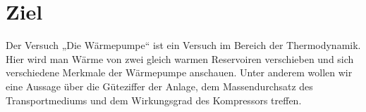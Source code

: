 \section{Ziel}
\label{sec:Ziel}
Der Versuch „Die Wärmepumpe“ ist ein Versuch im Bereich der Thermodynamik.
Hier wird man Wärme von zwei gleich warmen Reservoiren verschieben und sich 
verschiedene Merkmale der Wärmepumpe anschauen.
Unter anderem wollen wir eine Aussage über die Güteziffer der Anlage,
dem Massendurchsatz des Transportmediums und dem Wirkungsgrad des Kompressors treffen.